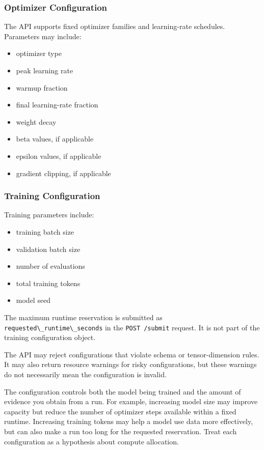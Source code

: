\documentclass[
  11pt,
]{article}
\newcommand{\passthrough}[1]{#1}
\providecommand{\tightlist}{%
  \setlength{\itemsep}{0pt}\setlength{\parskip}{0pt}}
\begin{document}
\hypertarget{optimizer-configuration}{%
\subsubsection{Optimizer Configuration}\label{optimizer-configuration}}

The API supports fixed optimizer families and learning-rate schedules.
Parameters may include:

\begin{itemize}
\tightlist
\item
  optimizer type
\item
  peak learning rate
\item
  warmup fraction
\item
  final learning-rate fraction
\item
  weight decay
\item
  beta values, if applicable
\item
  epsilon values, if applicable
\item
  gradient clipping, if applicable
\end{itemize}

\hypertarget{training-configuration}{%
\subsubsection{Training Configuration}\label{training-configuration}}

Training parameters include:

\begin{itemize}
\tightlist
\item
  training batch size
\item
  validation batch size
\item
  number of evaluations
\item
  total training tokens
\item
  model seed
\end{itemize}

The maximum runtime reservation is submitted as
\passthrough{\lstinline!requested\_runtime\_seconds!} in the
\passthrough{\lstinline!POST /submit!} request. It is not part of the
training configuration object.

The API may reject configurations that violate schema or
tensor-dimension rules. It may also return resource warnings for risky
configurations, but these warnings do not necessarily mean the
configuration is invalid.

The configuration controls both the model being trained and the amount
of evidence you obtain from a run. For example, increasing model size
may improve capacity but reduce the number of optimizer steps available
within a fixed runtime. Increasing training tokens may help a model use
data more effectively, but can also make a run too long for the
requested reservation. Treat each configuration as a hypothesis about
compute allocation.
\end{document}
